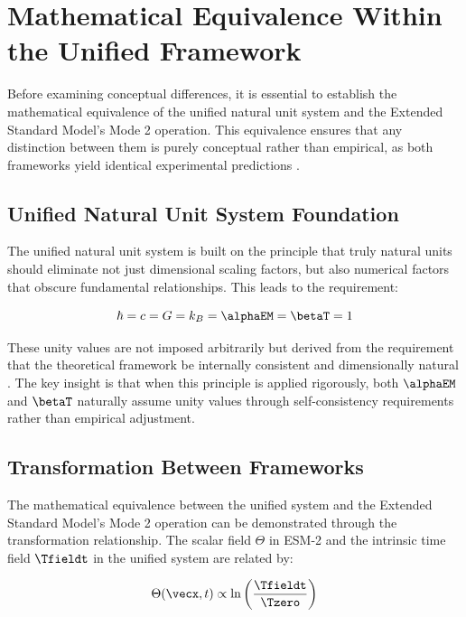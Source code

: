 	\section{Mathematical Equivalence Within the Unified Framework}
	\label{sec:mathematical_equivalence}
	
	Before examining conceptual differences, it is essential to establish the mathematical equivalence of the unified natural unit system and the Extended Standard Model's Mode 2 operation. This equivalence ensures that any distinction between them is purely conceptual rather than empirical, as both frameworks yield identical experimental predictions \cite{pascher_unified_2025}.
	
	\subsection{Unified Natural Unit System Foundation}
	\label{subsec:unified_foundation}
	
	The unified natural unit system is built on the principle that truly natural units should eliminate not just dimensional scaling factors, but also numerical factors that obscure fundamental relationships. This leads to the requirement:
	
	\begin{equation}
		\hbar = c = G = k_B = \alphaEM = \betaT = 1
	\end{equation}
	
	These unity values are not imposed arbitrarily but derived from the requirement that the theoretical framework be internally consistent and dimensionally natural \cite{pascher_beta_derivation_2025}. The key insight is that when this principle is applied rigorously, both $\alphaEM$ and $\betaT$ naturally assume unity values through self-consistency requirements rather than empirical adjustment.
	
	\subsection{Transformation Between Frameworks}
	\label{subsec:transformation}
	
	The mathematical equivalence between the unified system and the Extended Standard Model's Mode 2 operation can be demonstrated through the transformation relationship. The scalar field $\Theta$ in ESM-2 and the intrinsic time field $\Tfieldt$ in the unified system are related by:
	
	\begin{equation}
		\Theta(\vecx,t) \propto \ln\left(\frac{\Tfieldt}{\Tzero}\right)
	\end{equation}
	
